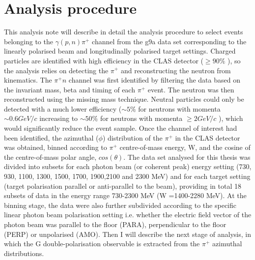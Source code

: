 \section{Analysis procedure}
This analysis note  will describe in detail the analysis procedure to select events belonging to the $\gamma (p,n) \pi^+$ channel from the g9a data set corresponding to the linearly polarised beam and longitudinally polarised target settings. Charged particles are identified with high efficiency in the CLAS detector ($\geq90\%$ \cite{Mecking2003}), so the analysis relies on detecting the $\pi^+$ and reconstructing the neutron from kinematics. The $\pi^+ n$ channel was first identified by filtering the data based on the invariant mass, beta and timing of each $\pi^+$ event. The neutron was then reconstructed using the missing mass technique. Neutral particles could only be detected with a much lower efficiency ($\sim5\%$ for neutrons with momenta $\sim 0.6 GeV/c$ increasing to $\sim 50\%$ for neutrons with momenta $\geq2 GeV/c$  \cite{Mecking2003}), which would significantly reduce the event sample. Once the channel of interest had been identified, the azimuthal ($\phi$) distribution of the $\pi^+$ in the CLAS detector was obtained, binned according to $\pi^+$ centre-of-mass energy, W, and the cosine of the centre-of-mass polar angle, $cos(\theta)$. The data set analysed for this thesis was divided into subsets for each photon beam (or coherent peak) energy setting (730, 930, 1100, 1300, 1500, 1700, 1900,2100 and 2300 MeV) and for each target setting (target polarisation parallel or anti-parallel to the beam), providing in total 18 subsets of data in the energy range 730-2300 MeV (W =1400-2280 MeV). At the binning stage, the data were  also further subdivided according to the specific linear photon beam polarisation setting i.e. whether the electric field vector of the photon beam was parallel to the floor (PARA), perpendicular to the floor (PERP) or unpolarised (AMO). Then I will describe the next stage of analysis, in which the G double-polarisation observable is extracted from the $\pi^+$ azimuthal distributions.

